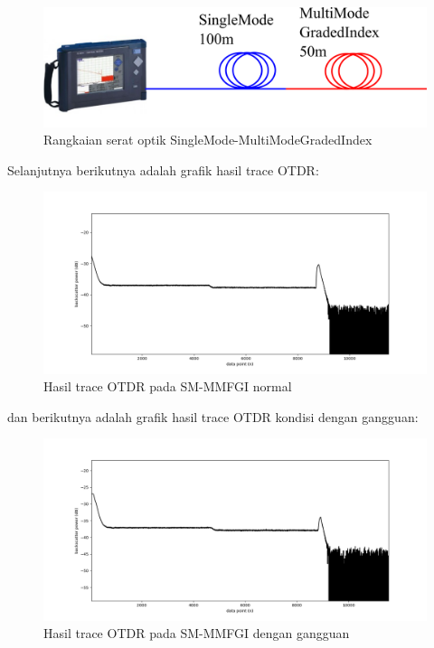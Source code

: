 \documentclass[12pt]{article}
\begin{document}
\begin{enumerate}
		\begin{figure}[!ht]
			\centering
			\captionsetup{justification=centering}
			\includegraphics[width=0.6\linewidth]{images/Bab_4/smgi}
			\caption[Trace SMF-SMF]{\small{Rangkaian serat optik SingleMode-MultiModeGradedIndex}}
		\end{figure}
	
		Selanjutnya berikutnya adalah grafik hasil trace OTDR:
		
		\begin{figure}[!ht]
			\centering
			\captionsetup{justification=centering}
			\includegraphics[width=0.9\linewidth]{images/Bab_4/Bab_4_3c1}
			\caption[Trace SM-MMFGI ]{\small{Hasil trace OTDR pada SM-MMFGI normal}}
		\end{figure}
	
		dan berikutnya adalah grafik hasil trace OTDR kondisi dengan gangguan:
		
		\begin{figure}[!ht]
			\centering
			\captionsetup{justification=centering}
			\includegraphics[width=0.9\linewidth]{images/Bab_4/Bab_4_3c2}
			\caption[Trace SM-MMFGI ]{\small{Hasil trace OTDR pada SM-MMFGI dengan gangguan}}
		\end{figure}
	

\end{enumerate}
\end{document}
